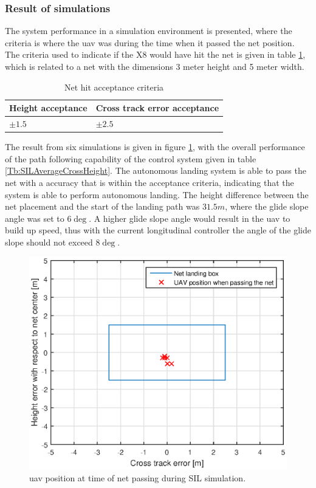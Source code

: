 \subsubsection{Result of simulations}\label{SIL:Results}
The system performance in a simulation environment is presented, where the criteria is where the \gls{uav} was during the time when it passed the net position. The criteria used to indicate if the X8 would have hit the net is given in table \ref{tb:NetCriteria}, which is related to a net with the dimensions 3 meter height and 5 meter width.
\begin{table}[H]
\centering
\begin{tabular}{| l | l |}
\hline
\textbf{Height acceptance}	& \textbf{Cross track error acceptance}	\\ \hline
$\pm1.5$					& $\pm2.5$								\\ \hline
\end{tabular}
\caption{Net hit acceptance criteria}
\label{tb:NetCriteria}
\end{table}
The result from six simulations is given in figure \ref{Fig:SILNetPasing}, with the overall performance of the path following capability of the control system given in table \ref{Tb:SILAverageCrossHeight}. The autonomous landing system is able to pass the net with a accuracy that is within the acceptance criteria, indicating that the system is able to perform autonomous landing. The height difference between the net placement and the start of the landing path was $31.5 m$, where the glide slope angle was set to $6\deg$. A higher glide slope angle would result in the \gls{uav} to build up speed, thus with the current longitudinal controller the angle of the glide slope should not exceed $8\deg$.
\begin{figure}[H]
\centering
\includegraphics[scale=0.7]{figs/SysPlot/SILNetPasing.eps}
\caption{\gls{uav} position at time of net passing during SIL simulation.}
\label{Fig:SILNetPasing}
\end{figure}
